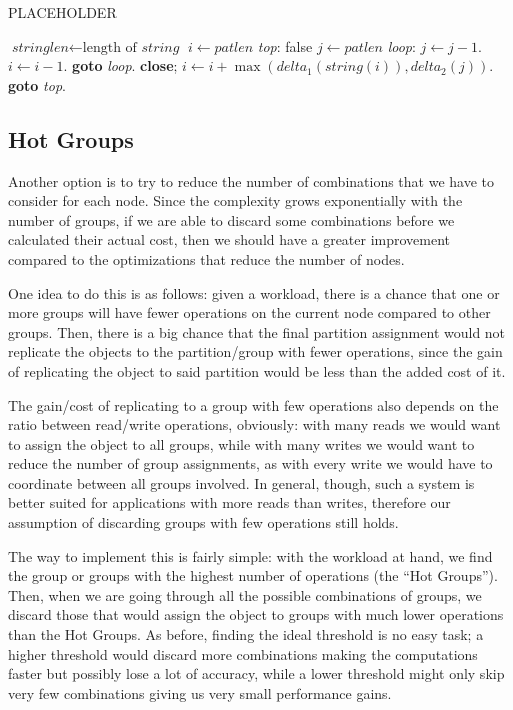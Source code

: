 \begin{algorithm}
  \caption{PLACEHOLDER}\label{alg:variable-size}
  \begin{algorithmic}[1]
  \State $\textit{stringlen} \gets \text{length of }\textit{string}$
  \State $i \gets \textit{patlen}$
  \State \emph{top}:
   \Return false
  \EndIf
  \State $j \gets \textit{patlen}$
  \State \emph{loop}:
  \State $j \gets j-1$.
  \State $i \gets i-1$.
  \State \textbf{goto} \emph{loop}.
  \State \textbf{close};
  \EndIf
  \State $i \gets i+\max(\textit{delta}_1(\textit{string}(i)),\textit{delta}_2(j))$.
  \State \textbf{goto} \emph{top}.
  \EndProcedure
  \end{algorithmic}
  \end{algorithm}

\subsection{Hot Groups}\label{sec:hot-groups}
Another option is to try to reduce the number of combinations that we have to consider for each node. Since the complexity grows exponentially with the number of groups, if we are able to discard some combinations before we calculated their actual cost, then we should have a greater improvement compared to the optimizations that reduce the number of nodes.

One idea to do this is as follows: given a workload, there is a chance that one or more groups will have fewer operations on the current node compared to other groups. Then, there is a big chance that the final partition assignment would not replicate the objects to the partition/group with fewer operations, since the gain of replicating the object to said partition would be less than the added cost of it.

The gain/cost of replicating to a group with few operations also depends on the ratio between read/write operations, obviously: with many reads we would want to assign the object to all groups, while with many writes we would want to reduce the number of group assignments, as with every write we would have to coordinate between all groups involved. In general, though, such a system is better suited for applications with more reads than writes, therefore our assumption of discarding groups with few operations still holds.

The way to implement this is fairly simple: with the workload at hand, we find the group or groups with the highest number of operations (the ``Hot Groups''). Then, when we are going through all the possible combinations of groups, we discard those that would assign the object to groups with much lower operations than the Hot Groups. As before, finding the ideal threshold is no easy task; a higher threshold would discard more combinations making the computations faster but possibly lose a lot of accuracy, while a lower threshold might only skip very few combinations giving us very small performance gains. 


